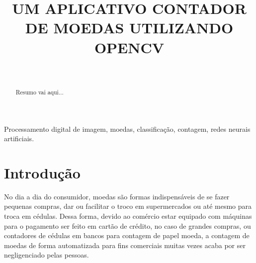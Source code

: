 \documentclass[10pt,journal,compsoc]{IEEEtran}
\begin{document}
\title{UM APLICATIVO CONTADOR DE MOEDAS UTILIZANDO OPENCV}

\author{
	\and \\
}

\maketitle

\begin{abstract}
Resumo vai aqui...
\end{abstract}

\begin{IEEEkeywords}
Processamento digital de imagem, moedas, classificação, contagem, redes neurais artificiais.
\end{IEEEkeywords}


%
\section{Introdução}
\label{sec:introducao}

No dia a dia do consumidor, moedas são formas indispensáveis de se fazer pequenas compras, dar ou facilitar o troco em supermercados ou até mesmo para troca em cédulas. Dessa forma, devido ao comércio estar equipado com máquinas para o pagamento ser feito em cartão de crédito, no caso de grandes compras, ou contadores de cédulas em bancos para contagem de papel moeda, a contagem de moedas de forma automatizada para fins comerciais  muitas vezes acaba por ser negligenciado pelas pessoas.
\end{document}

